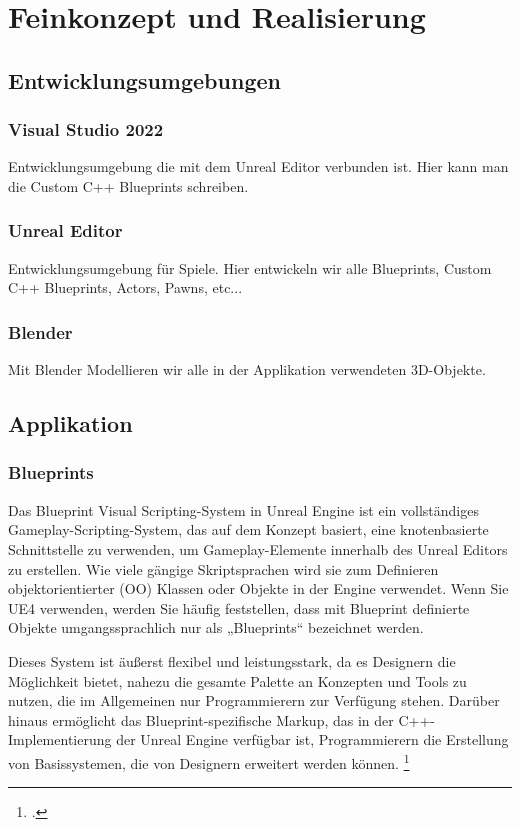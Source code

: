 \chapter{Feinkonzept und Realisierung}

\section{Entwicklungsumgebungen}
\subsection{Visual Studio 2022}
Entwicklungsumgebung die mit dem Unreal Editor verbunden ist. Hier kann man die Custom C++
Blueprints schreiben.

\subsection{Unreal Editor}
Entwicklungsumgebung für Spiele. Hier entwickeln wir alle Blueprints, Custom C++ Blueprints,
Actors, Pawns, etc...

\subsection{Blender}
Mit Blender Modellieren wir alle in der Applikation verwendeten 3D-Objekte.

\section{Applikation}

\subsection{Blueprints}
Das Blueprint Visual Scripting-System in Unreal Engine ist ein vollständiges
Gameplay-Scripting-System, das auf dem Konzept basiert, eine knotenbasierte Schnittstelle
zu verwenden, um Gameplay-Elemente innerhalb des Unreal Editors zu erstellen.
Wie viele gängige Skriptsprachen wird sie zum Definieren objektorientierter (OO) Klassen
oder Objekte in der Engine verwendet. Wenn Sie UE4 verwenden, werden Sie häufig feststellen,
dass mit Blueprint definierte Objekte umgangssprachlich nur als „Blueprints“ bezeichnet werden.

Dieses System ist äußerst flexibel und leistungsstark, da es Designern die Möglichkeit bietet,
nahezu die gesamte Palette an Konzepten und Tools zu nutzen, die im Allgemeinen nur
Programmierern zur Verfügung stehen. Darüber hinaus ermöglicht das Blueprint-spezifische
Markup, das in der C++-Implementierung der Unreal Engine verfügbar ist, Programmierern die
Erstellung von Basissystemen, die von Designern erweitert werden können. \footcite{https://docs.unrealengine.com/4.27/en-US/ProgrammingAndScripting/Blueprints/}

